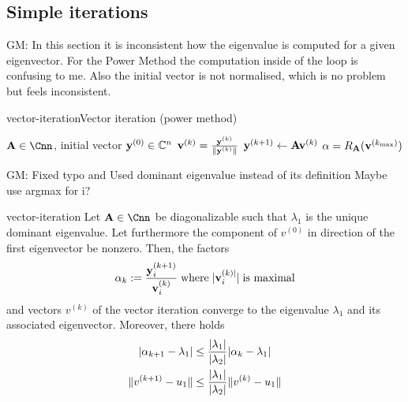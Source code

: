 \subsection{Simple iterations}

\begin{todo}
  GM:
  In this section it is inconsistent how the eigenvalue is computed for a given eigenvector. For the Power Method the
  computation inside of the loop is confusing to me. Also the initial vector is not normalised, which is no problem but feels
  inconsistent.
\end{todo}

\begin{Algorithm*}{vector-iteration}{Vector iteration (power method)}
  \begin{algorithmic}[1]
    \Require $\mata\in\Cnn$, initial vector $\mathbf y^{(0)}\in\mathbb C^n$
    \State $\mathbf v^{(k)} = \frac{\mathbf y^{(k)}}{\lVert\mathbf y^{(k)}\rVert}$
    \State $\mathbf y^{(k+1)} \gets \mathbf A \mathbf v^{(k)}$
    \EndFor
    \State $\alpha = R_\mathbf A(\mathbf v^{(k_{\max})})$
  \end{algorithmic}
\end{Algorithm*}

\begin{todo}
  GM:
  Fixed typo and
  Used dominant eigenvalue instead of its definition
  Maybe use argmax for i?
\end{todo}
\begin{Theorem}{vector-iteration}
  Let $\mata\in\Cnn$ be diagonalizable such that $\lambda_1$ is the
  unique dominant eigenvalue. Let furthermore the
  component of $v^{(0)}$ in direction of the first eigenvector be
  nonzero. Then, the factors
  \[\alpha_k := \frac{\mathbf y^{(k+1)}_i}{\mathbf v_i^{(k)}} \; \text{where} \; |\mathbf v_i^{(k)|}| \; \text{is maximal}\]
  and vectors $v^{(k)}$ of the
  vector iteration converge to the eigenvalue $\lambda_1$ and its
  associated eigenvector. Moreover, there holds
  \begin{align}
    \lvert\alpha_{k+1}-\lambda_1\rvert
    &\le \frac{\lvert\lambda_1\rvert}{\lvert\lambda_2\rvert} \lvert\alpha_{k}-\lambda_1\rvert\\
    \lVert v^{(k+1)}-u_1\rVert
    &\le \frac{\lvert\lambda_1\rvert}{\lvert\lambda_2\rvert} \lVert v^{(k)}-u_1\rVert
  \end{align}
\end{Theorem}

